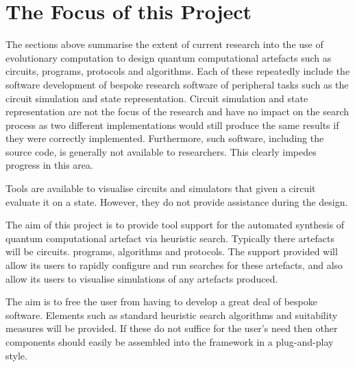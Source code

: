 \section{The Focus of this Project}
The sections above summarise the extent of current research into the use of evolutionary computation to design quantum computational artefacts such as circuits, programs, protocols and algorithms.
Each of these repeatedly include the software development of bespoke research software of peripheral tasks such as the circuit simulation and state representation.
Circuit simulation and state representation are not the focus of the research and have no impact on the search process as two different implementations would still produce the same results if they were correctly implemented.
Furthermore, such software, including the source code, is generally not available to researchers.
This clearly impedes progress in this area.


Tools are available to visualise circuits and simulators that given a circuit evaluate it on a state.
However, they do not provide assistance during the design.

The aim of this project is to provide tool support for the automated synthesis of quantum computational artefact via heuristic search.
Typically there artefacts will be circuits. programs, algorithms and protocols.
The support provided will allow its users to rapidly configure and run searches for these artefacts, and also allow its users to visualise simulations of any artefacts produced.

The aim is to free the user from having to develop a great deal of bespoke software.
Elements such as standard heuristic search algorithms and suitability measures will be provided.
If these do not suffice for the user's need then other components should easily be assembled into the framework in a plug-and-play style.

